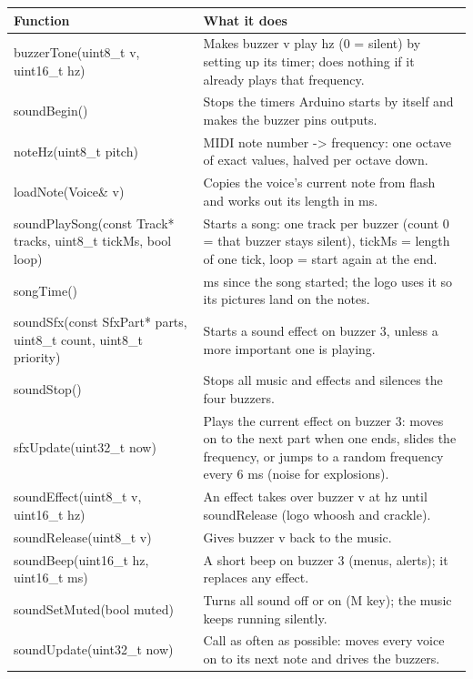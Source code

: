 \documentclass[11pt,a4paper]{article}
\begin{document}
{\footnotesize\begin{longtable}{|>{\raggedright\arraybackslash}p{5.82cm}|>{\raggedright\arraybackslash}p{10.68cm}|}
\hline\rowcolor{accent}\textbf{\color{white}Function} & \textbf{\color{white}What it does}\\\hline\endhead
buzzerTone(uint8\_t v, uint16\_t hz) & Makes buzzer v play hz (0 = silent) by setting up its timer; does nothing if it already plays that frequency.\\\hline
\rowcolor{rowshade}soundBegin() & Stops the timers Arduino starts by itself and makes the buzzer pins outputs.\\\hline
noteHz(uint8\_t pitch) & MIDI note number -> frequency: one octave of exact values, halved per octave down.\\\hline
\rowcolor{rowshade}loadNote(Voice\& v) & Copies the voice's current note from flash and works out its length in ms.\\\hline
soundPlaySong(const Track* tracks, uint8\_t tickMs, bool loop) & Starts a song: one track per buzzer (count 0 = that buzzer stays silent), tickMs = length of one tick, loop = start again at the end.\\\hline
\rowcolor{rowshade}songTime() & ms since the song started; the logo uses it so its pictures land on the notes.\\\hline
soundSfx(const SfxPart* parts, uint8\_t count, uint8\_t priority) & Starts a sound effect on buzzer 3, unless a more important one is playing.\\\hline
\rowcolor{rowshade}soundStop() & Stops all music and effects and silences the four buzzers.\\\hline
sfxUpdate(uint32\_t now) & Plays the current effect on buzzer 3: moves on to the next part when one ends, slides the frequency, or jumps to a random frequency every 6 ms (noise for explosions).\\\hline
\rowcolor{rowshade}soundEffect(uint8\_t v, uint16\_t hz) & An effect takes over buzzer v at hz until soundRelease (logo whoosh and crackle).\\\hline
soundRelease(uint8\_t v) & Gives buzzer v back to the music.\\\hline
\rowcolor{rowshade}soundBeep(uint16\_t hz, uint16\_t ms) & A short beep on buzzer 3 (menus, alerts); it replaces any effect.\\\hline
soundSetMuted(bool muted) & Turns all sound off or on (M key); the music keeps running silently.\\\hline
\rowcolor{rowshade}soundUpdate(uint32\_t now) & Call as often as possible: moves every voice on to its next note and drives the buzzers.\\\hline
\end{longtable}}
\end{document}
